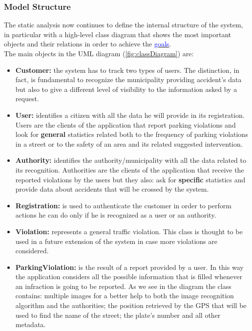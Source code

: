 	\subsubsection{Model Structure}
	The static analysis now continues to define the internal structure of the system, in particular with a high-level class diagram that shows the most important objects and their relations in order to achieve the \hyperref[sec:goals]{\textcolor{blue}{goals}}.\\
	
	The main objects in the UML diagram (\autoref{fig:classDiagram}) are:
	\begin{itemize}
		\item \textbf{Customer:} the system has to track two types of users. The distinction, in fact, is fundamental to recognize the municipality providing accident's data but also to give a different level of visibility to the information asked by a request.
		\item \textbf{User:} identifies a citizen with all the data he will provide in its registration. Users are the clients of the application that report parking violations and look for \textbf{general} statistics related both to the frequency of parking violations in a street or to the safety of an area and its related suggested intervention.
		\item \textbf{Authority:} identifies the authority/municipality with all the data related to its recognition. Authorities are the clients of the application that receive the reported violations by the users but they also: ask for \textbf{specific} statistics and provide data about accidents that will be crossed by the system.
		\item \textbf{Registration:} is used to authenticate the customer in order to perform actions he can do only if he is recognized as a user or an authority.
		\item \textbf{Violation:} represents a general traffic violation. This class is thought to be used in a future extension of the system in case more violations are considered.
		\item \textbf{ParkingViolation:} is the result of a report provided by a user. In this way the application considers all the possible information that is filled whenever an infraction is going to be reported. As we see in the diagram the class contains: multiple images for a better help to both the image recognition algorithm and the authorities; the position retrieved by the GPS that will be used to find the name of the street; the plate's number and all other metadata.

\end{itemize}
